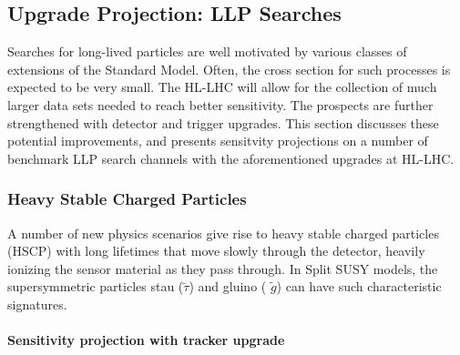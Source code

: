 


\subsection{Upgrade Projection: LLP Searches} \label{sec:upgradesearch}

Searches for long-lived particles are well motivated by various classes of extensions of the Standard Model. 
Often, the cross section for such processes is expected to be very small. The HL-LHC will allow for the collection of much larger data sets needed to reach better sensitivity. 
The prospects are further strengthened with detector and trigger upgrades. 
This section discusses these potential improvements, and presents sensitvity projections on a number of benchmark LLP search channels with the aforementioned upgrades at HL-LHC. 

\subsubsection{Heavy Stable Charged Particles}

A number of new physics scenarios give rise to heavy stable charged particles (HSCP) with long lifetimes that move slowly through the detector, heavily
ionizing the sensor material as they pass through. 
In Split SUSY models, the supersymmetric particles stau ($\tilde{\tau}$) and gluino ( $\tilde{g}$) can have such characteristic signatures.

\paragraph{Sensitivity projection with tracker upgrade} 


